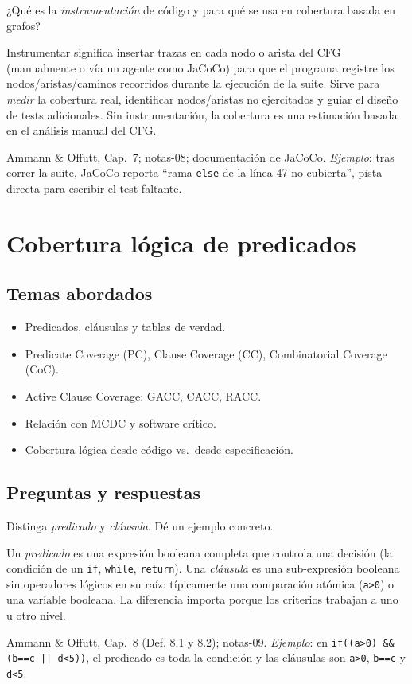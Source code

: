 \documentclass[11pt,a4paper]{article}
\newcounter{preg}
\newcommand{\qa}[3]{%
  \stepcounter{preg}%
  \vspace{0.4em}
  \begin{preguntabox}{\thepreg}
  #1
  \end{preguntabox}
  \begin{respuestabox}
  #2
  \end{respuestabox}
  \begin{refbox}
  #3
  \end{refbox}
  \vspace{0.6em}
}
\begin{document}
\qa{¿Qué es la \emph{instrumentación} de código y para qué se usa en cobertura basada en grafos?}
{Instrumentar significa insertar trazas en cada nodo o arista del CFG (manualmente o vía un agente como JaCoCo) para que el programa registre los nodos/aristas/caminos recorridos durante la ejecución de la suite. Sirve para \emph{medir} la cobertura real, identificar nodos/aristas no ejercitados y guiar el diseño de tests adicionales. Sin instrumentación, la cobertura es una estimación basada en el análisis manual del CFG.}
{Ammann \& Offutt, Cap.~7; notas-08; documentación de JaCoCo. \emph{Ejemplo}: tras correr la suite, JaCoCo reporta ``rama \texttt{else} de la línea 47 no cubierta'', pista directa para escribir el test faltante.}

\section{Cobertura lógica de predicados}

\subsection*{Temas abordados}
\begin{itemize}[leftmargin=1.4em]
  \item Predicados, cláusulas y tablas de verdad.
  \item Predicate Coverage (PC), Clause Coverage (CC), Combinatorial Coverage (CoC).
  \item Active Clause Coverage: GACC, CACC, RACC.
  \item Relación con MCDC y software crítico.
  \item Cobertura lógica desde código vs.\ desde especificación.
\end{itemize}

\subsection*{Preguntas y respuestas}

\qa{Distinga \emph{predicado} y \emph{cláusula}. Dé un ejemplo concreto.}
{Un \emph{predicado} es una expresión booleana completa que controla una decisión (la condición de un \texttt{if}, \texttt{while}, \texttt{return}). Una \emph{cláusula} es una sub-expresión booleana sin operadores lógicos en su raíz: típicamente una comparación atómica (\texttt{a>0}) o una variable booleana. La diferencia importa porque los criterios trabajan a uno u otro nivel.}
{Ammann \& Offutt, Cap.~8 (Def. 8.1 y 8.2); notas-09. \emph{Ejemplo}: en \texttt{if((a>0) \&\& (b==c || d<5))}, el predicado es toda la condición y las cláusulas son \texttt{a>0}, \texttt{b==c} y \texttt{d<5}.}
\end{document}
